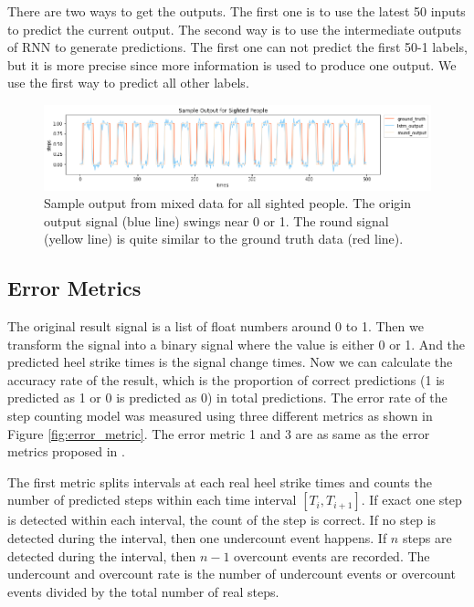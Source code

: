 \documentclass[11pt]{article}
\begin{document}
There are two ways to get the outputs. The first one is to use the latest 50 inputs to predict the current output. The second way is to use the intermediate outputs of RNN to generate predictions. The first one can not predict the first 50-1 labels, but it is more precise since more information is used to produce one output. We use the first way to predict all other labels.


\begin{figure}[ht]
\centering
\includegraphics[scale=0.5]{output_sighted}
\caption{Sample output from mixed data for all sighted people. The origin output signal (blue line) swings near 0 or 1. The round signal (yellow line) is quite similar to the ground truth data (red line).}
\label{fig:output_sighted}
\end{figure}



\subsection{Error Metrics}

The original result signal is a list of float numbers around 0 to 1. Then we transform the signal into a binary signal where the value is either 0 or 1. And the predicted heel strike times is the signal change times. Now we can calculate the accuracy rate of the result, which is the proportion of correct predictions (1 is predicted as 1 or 0 is predicted as 0) in total predictions. The error rate of the step counting model was measured using three different metrics as shown in Figure \ref{fig:error_metric}. The error metric 1 and 3 are as same as the error metrics proposed in \citep{flores2016weallwalk}.

The first metric splits intervals at each real heel strike times and counts the number of predicted steps within each time interval $[T_i, T_{i+1}]$.  If exact one step is detected within each interval, the count of the step is correct. If no step is detected during the interval, then one undercount event happens. If $n$ steps are detected during the interval, then $n-1$ overcount events are recorded. The undercount and overcount rate is the number of undercount events or overcount events divided by the total number of real steps.
\end{document}
